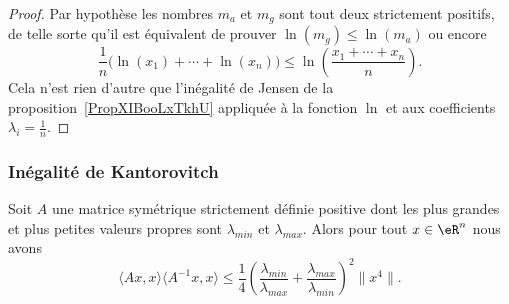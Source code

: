 \begin{proof}
    Par hypothèse les nombres \( m_a\) et \( m_g\) sont tout deux strictement positifs, de telle sorte qu'il est équivalent de prouver \( \ln(m_g)\leq \ln(m_a)\) ou encore
    \begin{equation}
        \frac{1}{ n }\big( \ln(x_1)+\cdots +\ln(x_n) \big)\leq \ln\left( \frac{ x_1+\cdots +x_n }{ n } \right).
    \end{equation}
    Cela n'est rien d'autre que l'inégalité de Jensen de la proposition~\ref{PropXIBooLxTkhU} appliquée à la fonction \( \ln\) et aux coefficients \( \lambda_i=\frac{1}{ n }\).
\end{proof}

\subsubsection{Inégalité de Kantorovitch}

\begin{proposition}    \label{PropMNUooFbYkug}
    Soit \( A\) une matrice symétrique strictement définie positive dont les plus grandes et plus petites valeurs propres sont \( \lambda_{min}\) et \( \lambda_{max}\). Alors pour tout \( x\in \eR^n\) nous avons
    \begin{equation}
        \langle Ax, x\rangle \langle A^{-1}x, x\rangle \leq \frac{1}{ 4 }\left( \frac{ \lambda_{min} }{ \lambda_{max} }+\frac{ \lambda_{max} }{ \lambda_{min} } \right)^2\| x^4 \|.
    \end{equation}
\end{proposition}

